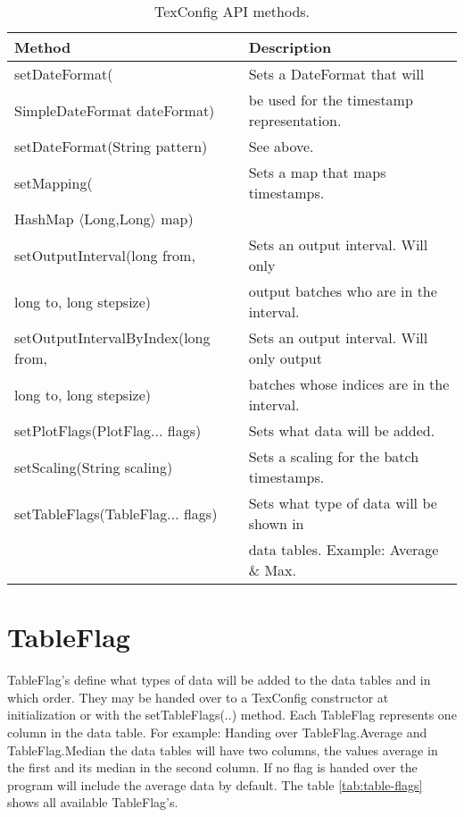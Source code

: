 \begin{table}[h]
\centering
\begin{tabular}[h]{|l|l|}\hline
	\textbf{Method} & \textbf{Description}\\
	\hline
	setDateFormat( & Sets a DateFormat that will\\
	SimpleDateFormat dateFormat) & be used for the timestamp representation.\\
	\hline
	setDateFormat(String pattern) & See above.\\
	\hline
	setMapping( & Sets a map that maps timestamps.\\
	HashMap $\langle$Long,Long$\rangle$ map) &\\
	\hline
	setOutputInterval(long from,& Sets an output interval. Will only\\
	long to, long stepsize) & output batches who are in the interval.\\
	\hline
	setOutputIntervalByIndex(long from,& Sets an output interval. Will only output\\
	long to, long stepsize) & batches whose indices are in the interval.\\
	\hline
	setPlotFlags(PlotFlag... flags) & Sets what data will be added.\\
	\hline
	setScaling(String scaling) & Sets a scaling for the batch timestamps.\\
	\hline
	setTableFlags(TableFlag... flags) & Sets what type of data will be shown in\\
	& data tables. Example: Average \& Max.\\
	\hline
\end{tabular}
\caption{TexConfig API methods.}
\label{tab:tex-methods}
\end{table}

\section{TableFlag}
TableFlag's define what types of data will be added to the data tables and in which order. They may be handed over to a TexConfig constructor at initialization or with the setTableFlags(..) method. Each TableFlag represents one column in the data table. For example: Handing over TableFlag.Average and TableFlag.Median the data tables will have two columns, the values average in the first and its median in the second column. If no flag is handed over the program will include the average data by default. The table \ref{tab:table-flags} shows all available TableFlag's.

